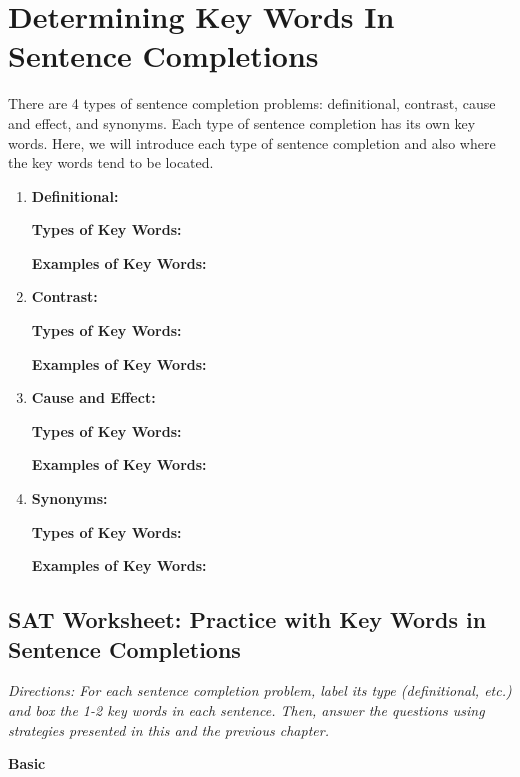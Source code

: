 \section{Determining Key Words In Sentence Completions}

There are 4 types of sentence completion problems: definitional, contrast, cause and effect, and
synonyms. Each type of sentence completion has its own key words. Here, we will introduce each
type of sentence completion and also where the key words tend to be located.

\begin{enumerate}
\item \textbf{Definitional:}

\textbf{Types of Key Words:}

\textbf{Examples of Key Words:}

\vfill

\item \textbf{Contrast:}

\textbf{Types of Key Words:}

\textbf{Examples of Key Words:}

\vfill

\item \textbf{Cause and Effect:}

\textbf{Types of Key Words:}

\textbf{Examples of Key Words:}

\vfill

\item \textbf{Synonyms:}

\textbf{Types of Key Words:}

\textbf{Examples of Key Words:}

\end{enumerate}

\pagebreak
\subsection{SAT Worksheet: Practice with Key Words in Sentence Completions}

\textit{Directions: For each sentence completion problem, label its type (definitional, etc.) and box the
1-2 key words in each sentence. Then, answer the questions using strategies presented in this and the previous chapter.}

\bigskip
\textbf{Basic}

